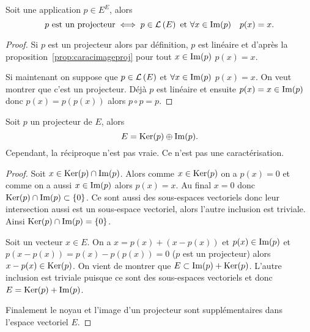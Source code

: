 \begin{prop}
  Soit une application \(p \in E^E\), alors
  \begin{equation}
    p \text{~est un projecteur} \iff p \in \mathcal{L}\left(E\right) \text{~et~} \forall x \in
    \operatorname{Im}(p) \quad p(x)=x.
  \end{equation}
\end{prop}
\begin{proof}
  Si \(p\) est un projecteur alors par définition, \(p\) est linéaire et d'après
  la proposition~\ref{prop:caracimageproj} pour tout \(x \in \operatorname{Im}(p)\) \(p(x)=x\).

  Si maintenant on suppose que \(p \in \mathcal{L}\left(E\right)\) et \(\forall x \in \operatorname{Im}(p)\)
  \(p(x)=x\). On veut montrer que c'est un projecteur. Déjà \(p\) est linéaire
  et ensuite \(p(x)=x \in \operatorname{Im}(p)\) donc \(p(x)=p(p(x))\) alors \(p \circ
  p=p\).
\end{proof}

\begin{prop}\label{prop:projecteursupplementaire}
  Soit \(p\) un projecteur de \(E\), alors
  \begin{equation}
    E = \operatorname{Ker}(p) \oplus \operatorname{Im}(p).
  \end{equation}
  Cependant, la réciproque n'est pas vraie. Ce n'est pas une caractérisation.
\end{prop}
\begin{proof}
  Soit \(x \in \operatorname{Ker}(p) \cap \operatorname{Im}(p)\). Alors comme \(x \in \operatorname{Ker}(p)\) on a
  \(p(x)=0\) et comme on a aussi \(x \in \operatorname{Im}(p)\) alors \(p(x)=x\). Au final
  \(x = 0\) donc \(\operatorname{Ker}(p) \cap \operatorname{Im}(p) \subset \{0\}\). Ce sont aussi des
  sous-espaces vectoriels donc leur intersection aussi est un sous-espace
  vectoriel, alors l'autre inclusion est triviale. Ainsi \(\operatorname{Ker}(p) \cap
  \operatorname{Im}(p)=\{0\}\).

  Soit un vecteur \(x \in E\). On a \(x = p(x) +(x-p(x))\) et \(p(x) \in
  \operatorname{Im}(p)\) et \(p(x-p(x))=p(x)-p(p(x))=0\) (\(p\) est un projecteur) alors
  \(x-p(x) \in \operatorname{Ker}(p)\). On vient de montrer que \(E \subset \operatorname{Im}(p) +
  \operatorname{Ker}(p)\). L'autre inclusion est triviale puisque ce sont des sous-espaces
  vectoriels et donc \(E = \operatorname{Ker}(p) +\operatorname{Im}(p)\).

  Finalement le noyau et l'image d'un projecteur sont supplémentaires dans
  l'espace vectoriel \(E\).
\end{proof}

